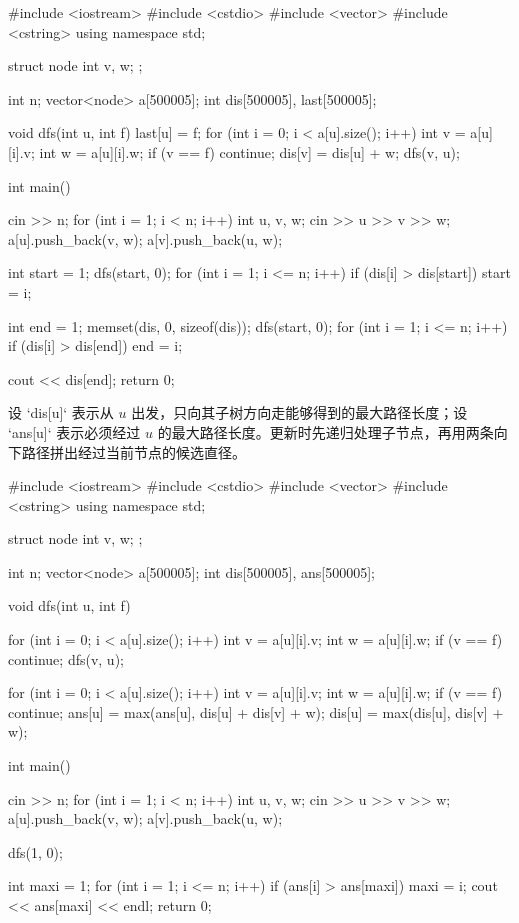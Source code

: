 \documentclass[UTF8,a4paper,11pt]{ctexart}
\newcommand{\topic}[1]{%
  \par\needspace{3\baselineskip}\vspace{0.45em}%
  \noindent{\bfseries\color{Primary}#1}\par\vspace{0.12em}%
}
\begin{document}
\begin{CodeBlock}
#include <iostream>
#include <cstdio>
#include <vector>
#include <cstring>
using namespace std;

struct node {
    int v, w;
};

int n;
vector<node> a[500005];
int dis[500005], last[500005];

void dfs(int u, int f) {
    last[u] = f;
    for (int i = 0; i < a[u].size(); i++) {
        int v = a[u][i].v;
        int w = a[u][i].w;
        if (v == f)
            continue;
        dis[v] = dis[u] + w;
        dfs(v, u);
    }
}

int main() {
    cin >> n;
    for (int i = 1; i < n; i++) {
        int u, v, w;
        cin >> u >> v >> w;
        a[u].push_back({v, w});
        a[v].push_back({u, w});
    }

    int start = 1;
    dfs(start, 0);
    for (int i = 1; i <= n; i++) {
        if (dis[i] > dis[start])
            start = i;
    }

    int end = 1;
    memset(dis, 0, sizeof(dis));
    dfs(start, 0);
    for (int i = 1; i <= n; i++) {
        if (dis[i] > dis[end])
            end = i;
    }

    cout << dis[end];
    return 0;
}
\end{CodeBlock}

\topic{树形 DP 求直径长度}

设 `dis[u]` 表示从 $u$ 出发，只向其子树方向走能够得到的最大路径长度；设 `ans[u]` 表示必须经过 $u$ 的最大路径长度。更新时先递归处理子节点，再用两条向下路径拼出经过当前节点的候选直径。

\begin{CodeBlock}
#include <iostream>
#include <cstdio>
#include <vector>
#include <cstring>
using namespace std;

struct node {
    int v, w;
};

int n;
vector<node> a[500005];
int dis[500005], ans[500005];

void dfs(int u, int f) {
    for (int i = 0; i < a[u].size(); i++) {
        int v = a[u][i].v;
        int w = a[u][i].w;
        if (v == f)
            continue;
        dfs(v, u);
    }

    for (int i = 0; i < a[u].size(); i++) {
        int v = a[u][i].v;
        int w = a[u][i].w;
        if (v == f)
            continue;
        ans[u] = max(ans[u], dis[u] + dis[v] + w);
        dis[u] = max(dis[u], dis[v] + w);
    }
}

int main() {
    cin >> n;
    for (int i = 1; i < n; i++) {
        int u, v, w;
        cin >> u >> v >> w;
        a[u].push_back({v, w});
        a[v].push_back({u, w});
    }

    dfs(1, 0);

    int maxi = 1;
    for (int i = 1; i <= n; i++) {
        if (ans[i] > ans[maxi])
            maxi = i;
    }
    cout << ans[maxi] << endl;
    return 0;
}
\end{CodeBlock}
\end{document}
